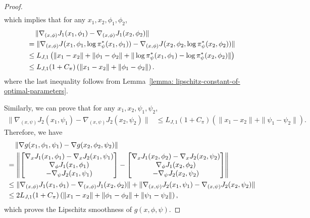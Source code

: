 \documentclass{article}
\theoremstyle{plain}
\theoremstyle{definition}
\theoremstyle{remark}
\begin{document}
\begin{proof}
\begin{align}
    \end{align}
    which implies that for any $x_1,x_2,\phi_1,\phi_2$,
    \begin{align}
        & \quad \, \| \nabla_{(x,\phi)} J_1(x_1,\phi_1) - \nabla_{(x,\phi)} J_1(x_2,\phi_2) \| \notag \\
        & = \| \nabla_{(x,\phi)} J(x_1,\phi_1,\log \pi^*_\psi(x_1,\phi_1)) - \nabla_{(x,\phi)} J(x_2,\phi_2,\log \pi^*_\psi(x_2,\phi_2)) \| \notag\\
        & \leq L_{J,1} \left( \| x_1 - x_2 \| + \| \phi_1 - \phi_2 \| + \| \log \pi^*_\psi(x_1,\phi_1) - \log \pi^*_\psi(x_2,\phi_2) \| \right) \notag\\
        & \leq L_{J,1} (1 + C_{\pi}) \left( \| x_1 - x_2 \| + \| \phi_1 - \phi_2 \| \right) .
    \end{align}
    where the last inequality follows from Lemma~\ref{lemma: lipschitz-constant-of-optimal-parameters}.

    Similarly, we can prove that for any $x_1,x_2,\psi_1,\psi_2$,
    \begin{align}
        \| \nabla_{(x,\psi)} J_2(x_1,\psi_1) - \nabla_{(x,\psi)} J_2(x_2,\psi_2) \| & \leq L_{J,1} (1 + C_\pi) \left( \| x_1 - x_2 \| + \| \psi_1 - \psi_2 \| \right) .
    \end{align}
    Therefore, we have
    \begin{align}
        & \quad \, \| \nabla g(x_1,\phi_1,\psi_1) - \nabla g(x_2,\phi_2,\psi_2) \| \notag \\
        & = \left\| \begin{bmatrix}
        \nabla_{x} J_1(x_1,\phi_1) - \nabla_{x} J_2(x_1,\psi_1) \\
        \nabla_{\phi} J_1(x_1,\phi_1)  \\
        - \nabla_{\psi} J_2(x_1,\psi_1)
         \end{bmatrix} 
        - \begin{bmatrix}
        \nabla_{x} J_1(x_2,\phi_2) - \nabla_{x} J_2(x_2,\psi_2) \\
        \nabla_{\phi} J_1(x_2,\phi_2)  \\
        - \nabla_{\psi} J_2(x_2,\psi_2) 
        \end{bmatrix} \right\| \notag \\
        & \leq \| \nabla_{(x,\phi)} J_1(x_1,\phi_1) - \nabla_{(x,\phi)} J_1(x_2,\phi_2) \| + \| \nabla_{(x,\psi)} J_2(x_1,\psi_1) - \nabla_{(x,\psi)} J_2(x_2,\psi_2) \| \notag\\
        & \leq 2 L_{J,1} (1 + C_{\pi}) \left( \| x_1 - x_2 \| + \| \phi_1 - \phi_2 \| + \| \psi_1 - \psi_2 \| \right) ,
    \end{align}
    which proves the Lipschitz smoothness of $g(x,\phi,\psi)$.


\end{proof}
\end{document}
